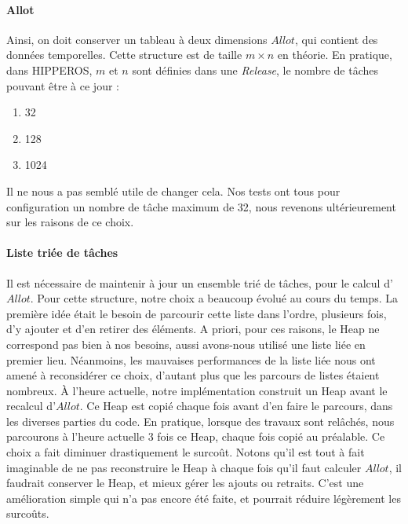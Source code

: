 		\paragraph{Allot}
		Ainsi, on doit conserver un tableau à deux dimensions $Allot$, qui contient des données 
		temporelles. 
		Cette structure est de taille $m \times n$ en théorie. 
		En pratique, dans HIPPEROS, $m$ et $n$ sont définies dans une \textit{Release}, 
		le nombre de tâches pouvant être à ce jour : 
		\begin{enumerate}
			\setlength\itemsep{0.1em}
			\item 32
			\item 128
			\item 1024
		\end{enumerate}
		Il ne nous a pas semblé utile de changer cela. Nos tests ont tous pour configuration 
		un nombre de tâche maximum de 32, nous revenons ultérieurement sur les raisons de ce choix.
		\newline
		
		\paragraph{Liste triée de tâches}
		Il est nécessaire de maintenir à jour un ensemble trié de tâches, pour le 
		calcul d'$Allot$. Pour cette structure, notre choix a beaucoup évolué au cours du temps. 
		La première idée était le besoin de parcourir cette liste dans l'ordre, plusieurs fois, 
		d'y ajouter et d'en retirer des éléments. A priori, pour ces raisons, le Heap ne 
		correspond pas bien à nos besoins, aussi avons-nous utilisé une liste liée en 
		premier lieu. Néanmoins, les mauvaises performances de la liste liée 
		nous ont amené à reconsidérer ce choix, d'autant plus que les parcours de listes étaient nombreux. 
		À l'heure actuelle, notre implémentation construit un Heap avant le recalcul d'$Allot$.
		Ce Heap est copié chaque fois avant d'en faire le parcours, dans les diverses parties du code.
		En pratique, lorsque des travaux sont relâchés, nous parcourons à l'heure actuelle 3 fois ce Heap, 
		chaque fois copié au préalable. 
		Ce choix a fait diminuer drastiquement le surcoût.
		Notons qu'il est tout à fait imaginable de ne pas reconstruire le Heap à chaque fois qu'il faut 
		calculer $Allot$, il faudrait conserver le Heap, et mieux gérer les ajouts ou retraits. C'est 
		une amélioration simple qui n'a pas encore été faite, et pourrait réduire légèrement les surcoûts.
		\newline
		
